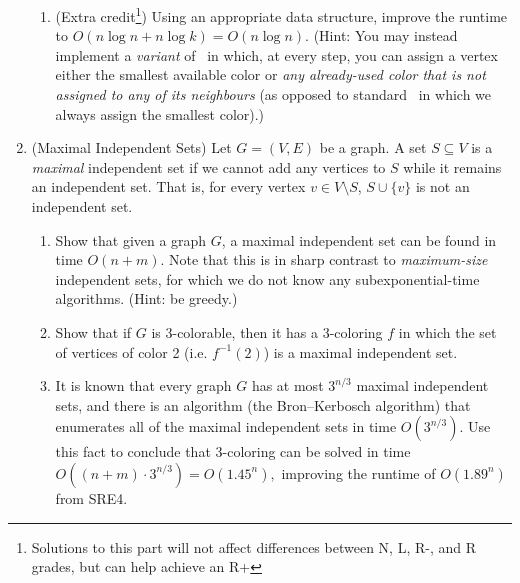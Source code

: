 \documentclass[11pt]{article}
\begin{document}
\begin{enumerate}
\begin{enumerate}
     \item (Extra credit\footnote{Solutions to this part will not affect differences between N, L, R-, and R grades, but can help achieve an R+})
     Using an appropriate data structure, improve the runtime to $O(n\log n+n\log k) = O(n\log n)$.
     (Hint: You may instead implement a \emph{variant} of \GreedyColoring\ in which, at every step, you can assign a vertex either the smallest available color or \emph{any already-used color that is not assigned to any of its neighbours} (as opposed to standard \GreedyColoring\ in which we always assign the smallest color).) 

\end{enumerate}

    

 



 \item (Maximal Independent Sets) \label{prob:maximalIS} Let $G=(V,E)$ be a graph.  A set $S\subseteq V$ is a {\em maximal} independent set if we cannot add any vertices to $S$ while it remains an independent set.  That is, for every vertex $v\in V\setminus S$, $S\cup\{v\}$ is not an independent set.
    \begin{enumerate}
        \item Show that given a graph $G$, a maximal independent set can be found in time $O(n+m)$.  Note that this is in sharp contrast to {\em maximum-size} independent sets, for which we do not know any subexponential-time algorithms. (Hint: be greedy.)\\

 
        
        \item Show that if $G$ is 3-colorable, then it has a 3-coloring $f$ in which the set of vertices of color 2 (i.e. $f^{-1}(2)$) is a maximal independent set.\\

        


        
        \item It is known that every graph $G$ has at most $3^{n/3}$ maximal independent sets, and there is an algorithm (the Bron--Kerbosch algorithm) that enumerates all of the maximal independent sets in time $O(3^{n/3}).$  Use this fact to conclude that 3-coloring can be solved in time $O((n+m)\cdot 3^{n/3}) = O(1.45^n),$ improving the runtime of $O(1.89^n)$ from SRE4.\\




\end{enumerate}
\end{enumerate}
\end{document}
